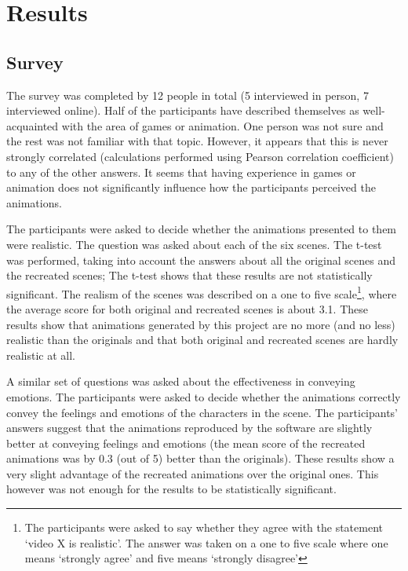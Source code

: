 \chapter{Results \label{chap:results}}

\section{Survey}
The survey was completed by 12 people in total (5 interviewed in person, 7 interviewed online). Half of the participants have described themselves as well-acquainted with the area of games or animation. One person was not sure and the rest was not familiar with that topic. However, it appears that this is never strongly correlated (calculations performed using Pearson correlation coefficient) to any of the other answers. It seems that having experience in games or animation does not significantly influence how the participants perceived the animations.

The participants were asked to decide whether the animations presented to them were realistic. The question was asked about each of the six scenes. The t-test was performed, taking into account the answers about all the original scenes and the recreated scenes; The t-test shows that these results are not statistically significant. The realism of the scenes was described on a one to five scale\footnote{The participants were asked to say whether they agree with the statement  `video X is realistic'. The answer was taken on a one to five scale where one means `strongly agree' and five means `strongly disagree'}, where the average score for both original and recreated scenes is about 3.1. These results show that animations generated by this project are no more (and no less) realistic than the originals and that both original and recreated scenes are hardly realistic at all.
	
A similar set of questions was asked about the effectiveness in conveying emotions. The participants were asked to decide whether the animations correctly convey the feelings and emotions of the characters in the scene. The participants' answers suggest that the animations reproduced by the software are slightly better at conveying feelings and emotions (the mean score of the recreated animations was by 0.3 (out of 5) better than the originals). These results show a very slight advantage of the recreated animations over the original ones. This however was not enough for the results to be statistically significant.

